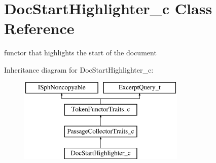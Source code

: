 \hypertarget{classDocStartHighlighter__c}{\section{Doc\-Start\-Highlighter\-\_\-c Class Reference}
\label{classDocStartHighlighter__c}
}


functor that highlights the start of the document  


Inheritance diagram for Doc\-Start\-Highlighter\-\_\-c\-:\begin{figure}[H]
\begin{center}
\leavevmode
\includegraphics[height=4.000000cm]{classDocStartHighlighter__c}
\end{center}
\end{figure}
